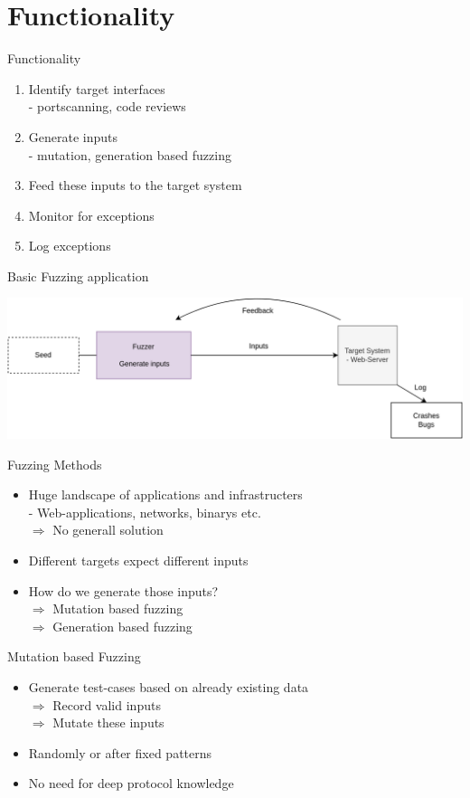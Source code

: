 \documentclass{beamer}
\begin{document}
\section{Functionality}
\begin{frame}{Functionality}
\begin{enumerate}
 \item Identify target interfaces\\
 - portscanning, code reviews
 \item Generate inputs\\
 - mutation, generation based fuzzing
 \item Feed these inputs to the target system
 \item Monitor for exceptions
 \item Log exceptions
\end{enumerate}

\end{frame}
\begin{frame}{Basic Fuzzing application}
\begin{center}
  \includegraphics[scale=0.15]{basicfuzz.png}
\end{center}
\end{frame}
\begin{frame}{Fuzzing Methods}
 \begin{itemize}
  \item Huge landscape of applications and infrastructers\\
  - Web-applications, networks, binarys etc.\\
  $\Rightarrow$ No generall solution
  \item Different targets expect different inputs
  \item How do we generate those inputs?\\
  $\Rightarrow$ Mutation based fuzzing\\
  $\Rightarrow$ Generation based fuzzing
 \end{itemize}

\end{frame}
\begin{frame}{Mutation based Fuzzing}
\begin{itemize}
 \item Generate test-cases based on already existing data\\
 $\Rightarrow$ Record valid inputs\\
 $\Rightarrow$ Mutate these inputs
 \item Randomly or after fixed patterns
 \item No need for deep protocol knowledge
\end{itemize}
\end{frame}
\end{document}
